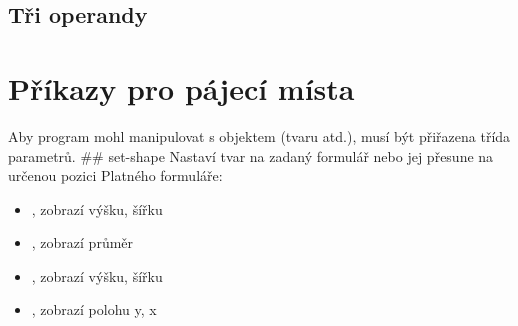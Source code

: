 \documentclass[letterpaper,10pt,czech]{sphinxmanual}
\begin{document}
\subsection{Tři operandy}
\label{\detokenize{parameter-programs_cz:tri-operandy}}
\begin{sphinxVerbatim}[commandchars=\\\{\}]
    

   
   
  
  
  

    
          
          
\end{sphinxVerbatim}


\section{Příkazy pro pájecí místa}
\label{\detokenize{parameter-programs_cz:prikazy-pro-pajeci-mista}}
Aby program mohl manipulovat s objektem (tvaru atd.),
musí být přiřazena třída parametrů. \#\# set-shape
 Nastaví tvar na zadaný
formulář nebo jej přesune na určenou pozici Platného formuláře:
\begin{itemize}
\item {} 
, zobrazí výšku, šířku

\item {} 
, zobrazí průměr

\item {} 
, zobrazí výšku, šířku

\item {} 
, zobrazí polohu y, x

\end{itemize}
\end{document}
